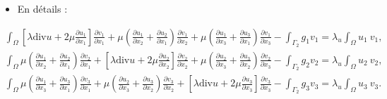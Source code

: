 \documentclass[french]{beamer}
\begin{document}
\begin{frame}
    \begin{itemize}
    \item En détails : \\
    \end{itemize}
\begin{tiny}


 \begin{eqnarray}
\int_{\Omega} \left[\lambda \mbox{div}u + 2 \mu \frac{\partial u_1}{\partial x_1}\right] \frac{\partial v_1}{\partial x_1} + \mu \left(\frac{\partial u_1}{\partial x_2} + \frac{\partial u_2}{\partial x_1}\right)\frac{\partial v_1}{\partial x_2} + \mu \left(\frac{\partial u_1}{\partial x_3} + \frac{\partial u_3}{\partial x_1}\right)\frac{\partial v_1}{\partial x_3}
- \int_{\Gamma_2} g_1 v_1 = \lambda_u\int_{\Omega}u_1\ v_1,\nonumber\\
\int_{\Omega} \mu \left(\frac{\partial u_1}{\partial x_2} + \frac{\partial u_2}{\partial x_1}\right)\frac{\partial v_2}{\partial x_1} + \left[\lambda \mbox{div}u + 2 \mu \frac{\partial u_2}{\partial x_2}\right] \frac{\partial v_2}{\partial x_2} + \mu \left(\frac{\partial u_2}{\partial x_3} + \frac{\partial u_3}{\partial x_2}\right)\frac{\partial v_2}{\partial x_3}
- \int_{\Gamma_2} g_2 v_2 = \lambda_u\int_{\Omega}u_2\ v_2,\\
\int_{\Omega} \mu \left(\frac{\partial u_1}{\partial x_3} + \frac{\partial u_3}{\partial x_1}\right)\frac{\partial v_3}{\partial x_1} + \mu \left(\frac{\partial u_2}{\partial x_3} + \frac{\partial u_3}{\partial x_2}\right)\frac{\partial v_3}{\partial x_2}  + \left[\lambda \mbox{div}u + 2 \mu \frac{\partial u_3}{\partial x_3}\right] \frac{\partial v_3}{\partial x_3}
- \int_{\Gamma_2} g_3 v_3 = \lambda_u\int_{\Omega}u_3\ v_3.\nonumber
  \end{eqnarray}    
\end{tiny}


\end{frame}
\end{document}
